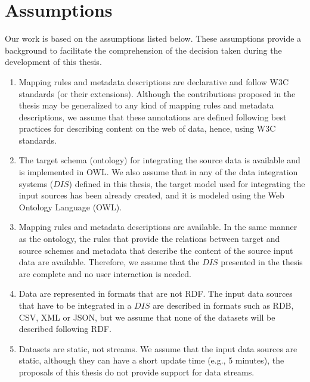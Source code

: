 \section{Assumptions}
Our work is based on the assumptions listed below. These assumptions provide a background to facilitate the comprehension of the decision taken during the development of this thesis.
\begin{enumerate}[label=\textbf{A{\arabic*}}]
    \item Mapping rules and metadata descriptions are declarative and follow W3C standards (or their extensions). Although the contributions proposed in the thesis may be generalized to any kind of mapping rules and metadata descriptions, we assume that these annotations are defined following best practices for describing content on the web of data, hence, using W3C standards. 
    \item The target schema (ontology) for integrating the source data is available and is implemented in OWL. We also assume that in any of the data integration systems ($DIS$) defined in this thesis, the target model used for integrating the input sources has been already created, and it is modeled using the Web Ontology Language (OWL).
    \item Mapping rules and metadata descriptions are available. In the same manner as the ontology, the rules that provide the relations between target and source schemes and metadata that describe the content of the source input data are available. Therefore, we assume that the $DIS$ presented in the thesis are complete and no user interaction is needed.
    \item Data are represented in formats that are not RDF. The input data sources that have to be integrated in a $DIS$ are described in formats such as RDB, CSV, XML or JSON, but we assume that none of the datasets will be described following RDF.
    \item Datasets are static, not streams. We assume that the input data sources are static, although they can have a short update time (e.g., 5 minutes), the proposals of this thesis do not provide support for data streams.
\end{enumerate}

